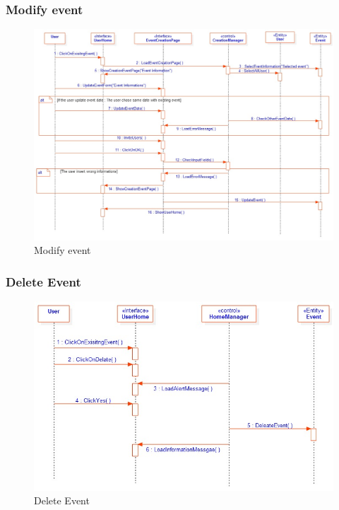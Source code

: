 \subsubsection{Modify event}
\begin{figure}[tbh]
  \begin{center}
  \includegraphics[width=150mm]{4modify}
    \caption{Modify event}\label{Fig 1:}
  \end{center}
\end{figure}
\newpage
\subsubsection{Delete Event}
\begin{figure}[tbh]
  \begin{center}
  \includegraphics[width=150mm]{5delete}
    \caption{Delete Event}\label{Fig 1:}
  \end{center}
\end{figure}
\newpage
